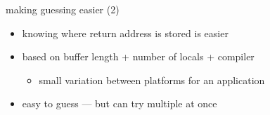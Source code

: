 
\begin{frame}[fragile,label=guessEasier2]{making guessing easier (2)}
\begin{itemize}
\item knowing where return address is stored is easier
\item based on buffer length + number of locals + compiler
    \begin{itemize}
    \item small variation between platforms for an application
    \end{itemize}
\item easy to guess --- but can try multiple at once    
\end{itemize}
\end{frame}


